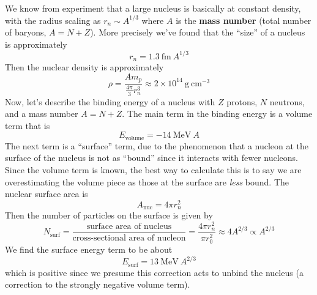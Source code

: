 \documentclass[10pt]{article}
\numberwithin{equation}{section}
\begin{document}
  We know from experiment that a large nucleus is basically at
  constant density, with the radius scaling as $r_n\sim A^{1/3}$ where
  $A$ is the \textbf{mass number} (total number of baryons,
  $A=N+Z$). More precisely we've found that the ``size'' of a nucleus
  is approximately
  \begin{equation}
    \label{eq:93}
    r_n=1.3\ \mathrm{fm}\ A^{1/3}
  \end{equation}
  Then the nuclear density is approximately
  \begin{equation}
    \label{eq:94}
    \rho=\frac{Am_p}{\frac{4\pi}{3}r_n^3}\approx2\times 10^{14}\
    \mathrm{g\  cm^{-3}} 
  \end{equation}
  Now, let's describe the binding energy of a nucleus with $Z$
  protons, $N$ neutrons, and a mass number $A=N+Z$. The main term in
  the binding energy is a volume term that is
  \begin{equation}
    \label{eq:95}
    E_{\mathrm{volume}}=-14\ \mathrm{MeV}\ A
  \end{equation}
  The next term is a ``surface'' term, due to the phenomenon that a
  nucleon at the surface of the nucleus is not as ``bound'' since it
  interacts with fewer nucleons. Since the volume term is known, the
  best way to calculate this is to say we are overestimating the
  volume piece as those at the surface are \emph{less} bound. The
  nuclear surface area is
  \begin{equation}
    \label{eq:367}
    A_{\mathrm{nuc}}=4\pi r_n^2
  \end{equation}
  Then the number of particles on the surface is given by
  \begin{equation}
    \label{eq:96}
    N_{\mathrm{surf}}=\frac{\textrm{surface area of
        nucleus}}{\textrm{cross-sectional area of nucleon}}=\frac{4\pi
      r_n^2}{\pi r_0^2}\approx 4A^{2/3}\propto A^{2/3}
  \end{equation}
  We find the surface energy term to be about
  \begin{equation}
    \label{eq:97}
    E_{\mathrm{surf}}=13\ \mathrm{MeV}\ A^{2/3}
  \end{equation}
  which is positive since we presume this correction acts to unbind
  the nucleus (a correction to the strongly negative volume term).\\
\end{document}
